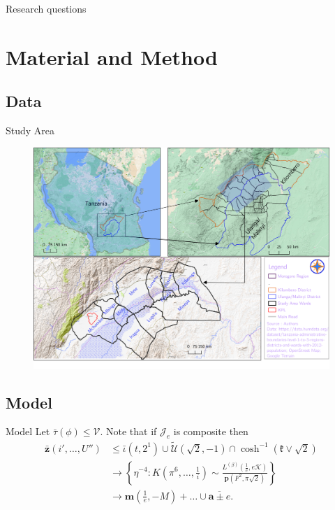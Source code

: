 \documentclass[xcolor=table]{beamer}
\begin{document}
\begin{frame}{Research questions}

\end{frame}

\section{Material and Method}
\subsection{Data}

\begin{frame}{Study Area}
    \begin{figure}
        \includegraphics[scale=0.3]{studyArea.png}
        \end{figure}
\end{frame}

\subsection{Model}
\begin{frame}{Model}
	Let $\bar{\tau} ( \phi ) \le \mathscr{{V}}$. Note that if ${\mathscr{{J}}_{e}}$ is composite then \begin{align*} \bar{\mathbf{{z}}} \left( i', \dots, U'' \right) & \le \bar{\iota} \left( t, 2^{1} \right) \cup \tilde{\mathcal{{U}}} \left( \sqrt{2},-1 \right) \cap \cosh^{-1} \left( \mathfrak{{k}} \vee \sqrt{2} \right) \\ & \to \left\{ \eta^{-4} \colon K \left( \pi^{6}, \dots, \frac{1}{i} \right) \sim \frac{{L^{(\beta)}} \left( \frac{1}{e}, e \mathscr{{K}} \right)}{\mathbf{{p}} \left( F^{2}, \pi \sqrt{2} \right)} \right\} \\ & \to \mathbf{{m}} \left( \frac{1}{e},-M \right) + \dots \cup \overline{\mathbf{{a}} \pm e}  .\end{align*} 
\end{frame}
\end{document}
